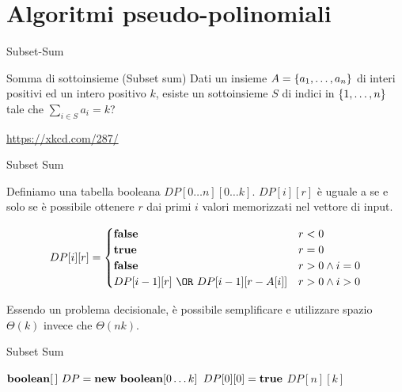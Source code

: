 \section{Algoritmi pseudo-polinomiali}

\begin{frame}{Subset-Sum}

\vspace{-9pt}
\begin{block}{Somma di sottoinsieme (Subset sum)}
Dati un insieme $A = \{ a_1 , \ldots, a_n\}$ di interi positivi ed un intero
positivo $k$, esiste un sottoinsieme $S$ di indici in $\{1, \ldots, n\}$ tale
che $\sum_{i \in S} a_i = k$?
\end{block}


\vfill
\tiny
\url{https://xkcd.com/287/}

\end{frame}

\begin{frame}{Subset Sum}

Definiamo una tabella booleana $DP[0 \ldots n][0 \ldots k]$. $DP[i][r]$ è uguale a \TRUE se e solo se è possibile ottenere $r$ dai primi $i$ valori memorizzati
nel vettore di input.

\[
DP[i][r] = \begin{cases}
  \FALSE & r < 0 \\
  \TRUE & r = 0 \\
  \FALSE & r > 0 \wedge i=0 \\
  DP[i-1][r]\ \OR\ DP[i-1][r-A[i]] & r>0 \wedge i>0
\end{cases}
\]

\bigskip
Essendo un problema decisionale, è possibile semplificare e utilizzare
spazio $\Theta(k)$ invece che $\Theta(nk)$.

\end{frame}

\begin{frame}{Subset Sum}

\begin{Procedure}
\caption[A]{\BOOLEAN \subsetsum($\INTARRAY\ A,\ \INTEGER\ n,\ \INTEGER\ k$)}

$\BOOLEAN[\,]\ DP = \NEW\ \BOOLEAN[0 \mldots k]$\;
$DP[0][0] = \TRUE$\;
\Return $DP[n][k]$\;
\end{Procedure}

\end{frame}

